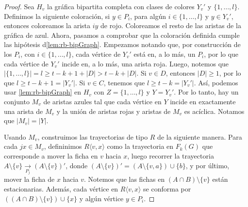 \begin{proof}
    Sea $H_v$ la gr\'afica bipartita completa con clases de colores $Y_v '$ y
    $\{1,\dots, l\}$. Definimos la siguiente coloraci\'on, si $y \in P_i$, para
    alg\'un $i \in \{1, \dots, l\}$ y $y \in Y_v '$, entonces coloreamos la
    arista $iy$ de rojo. Coloreamos el resto de las aristas de la gr\'afica de
    azul. Ahora, pasamos a comprobar que la coloraci\'on definida cumple las
    hip\'otesis d\cref{lem:rb-bipGraph}. Empezamos notando que, por
    construcci\'on de los $P_i$, con $i \in \{1, \dots, l\}$, cada v\'ertice de
    $Y_v '$ est\'a en, a lo m\'as, un $P_i$, por lo que cada v\'ertice de $Y_v
    '$ incide en, a lo m\'as, una arista roja. Luego, notemos que $|\{1, \dots,
    l\}| = l  \geq t-k+ 1+ |D| > t-k + |D|$. Si $v \in D$, entonces $|D| \geq
    1$, por lo que $l \geq t- k+1 = |Y_v '|$. Si $v \in C$, tenemos que $l \geq
    t-k = |Y_v '|$. As\'i, podemos usar \cref{lem:rb-bipGraph} en $H_v$ con $Z=
    \{1, \dots, l\}$ y $Y = Y_v '$. Por lo tanto, hay un conjunto $M_v$ de
    aristas azules tal que cada v\'ertice en $Y$ incide en exactamente una
    arista de $M_v$ y la uni\'on de aristas rojas y aristas de $M_v$ es
    ac\'iclica. Notamos que $|M_v|=|Y|$.

    Usando $M_v$, construimos las trayectorias de tipo $R$ de la siguiente
    manera. Para cada $jx \in M_v$, defininimos $R\langle v, x \rangle$ como la
    trayectoria en $F_k(G)$ que corresponde a mover la ficha en $v$ hacia $x$,
    luego recorrer la trayectoria $A\setminus \{v\} \xrightarrow[P_j]{}
    (A\setminus \{v\})'$, donde $(A\setminus \{v\})' = (A\setminus \{v,a\})\cup
    \{b\}$, y por \'ultimo, mover la ficha de $x$ hacia $v$. Notemos que las
    fichas en $(A\cap B)\setminus \{v\}$ est\'an estacionarias. Adem\'as, cada
    v\'ertice en $R\langle v,x \rangle$ se conforma por $((A\cap B)\setminus
    \{v\}) \cup \{x\}$ y alg\'un v\'ertice $y \in P_i$.


\end{proof}
